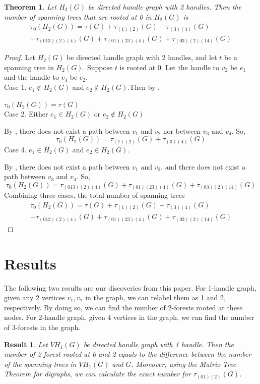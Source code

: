 \documentclass[twoside,11pt]{article}
\newtheorem{theorem}{Theorem}[section]
\numberwithin{equation}{section} \DeclareMathOperator{\Var}{Var}
\newcommand{\bpf}{\begin{proof}}
\newcommand{\epf}{\end{proof}}
\newcommand{\bthm}{\begin{theorem}}
\newcommand{\ethm}{\end{theorem}}
\newtheorem{result}{Result}
\begin{document}
\bthm \label{DH2 rooted at 0}
Let $H_2(G)$ be directed handle graph with 2 handles. Then the number of spanning trees that are rooted at 0 in $H_2(G)$ is
\begin{multline*}
\tau_0(H_2(G)) = \tau(G) + \tau_{(1)(2)}(G)+ \tau_{(3)(4)}(G)\\ + \tau_{(013)(2)(4)}(G) + \tau_{(01)(23)(4)}(G) + \tau_{(03)(2)(14)}(G)
\end{multline*}
\ethm

\bpf
Let $H_2(G)$ be directed handle graph with 2 handles, and let $t$ be a spanning tree in $H_2(G)$. Suppose $t$ is rooted at 0. Let the handle to $v_2$ be $e_1$ and the handle to $v_4$ be $e_2$.\\
Case 1. $e_1 \notin H_2(G)$ and $e_2 \notin H_2(G)$.Then by ,

$\tau_0(H_2(G))=\tau(G)$\\
Case 2. Either $e_1 \in H_2(G)$ or $e_2 \notin H_2(G)$

By , there does not exist a path between $v_1$ and $v_2$ nor between $v_3$ and $v_4$. So,
$$\tau_0(H_2(G))=\tau_{(1)(2)}(G)+ \tau_{(3)(4)}(G)$$ 
Case 4. $e_1\in H_2(G)$ and $e_2 \in H_2(G)$.

By , there does not exist a path between $v_1$ and $v_2$, and there does not exist a path between $v_3$ and $v_4$. So, $$\tau_0(H_2(G))=\tau_{(013)(2)(4)}(G) + \tau_{(01)(23)(4)}(G) + \tau_{(03)(2)(14)}(G)$$
Combining three cases, the total number of spanning trees
\begin{multline*}
\tau_0(H_2(G)) = \tau(G) + \tau_{(1)(2)}(G)+ \tau_{(3)(4)}(G)\\ + \tau_{(013)(2)(4)}(G) + \tau_{(01)(23)(4)}(G) + \tau_{(03)(2)(14)}(G)
\end{multline*}
\epf

\section{Results}

The following two results are our discoveries from this paper. For 1-handle graph, given any 2 vertices $v_1,v_2$ in the graph, we can relabel them as 1 and 2, respectively. By doing so, we can find the number of 2-forests rooted at these nodes. For 2-handle graph, given 4 vertices in the graph, we can find the number of 3-forests in the graph.

\begin{result}
Let $VH_1(G)$ be directed handle graph with 1 handle. Then the number of 2-forest rooted at 0 and 2 equals to the difference between the number of the spanning trees in $VH_1(G)$ and $G$. Moreover, using the Matrix Tree Theorem for digraphs, we can calculate the exact number for $\tau_{(01)(2)}(G)$.
\end{result}
\end{document}
